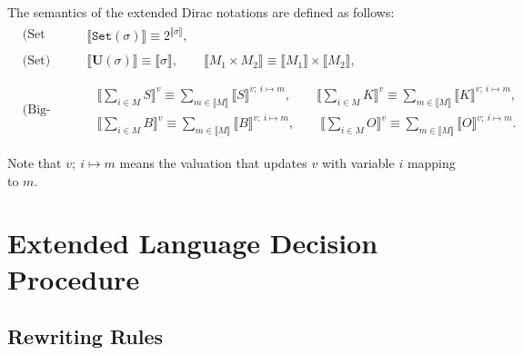 \documentclass[manuscript, review, timestamp]{acmart}
\newcommand*{\reduce}{\ \triangleright\ }
\newcommand*{\sem}[1]{\llbracket #1 \rrbracket}
\begin{document}
\begin{definition}
  The semantics of the extended Dirac notations are defined as follows:
  \begin{align*}
    & \text{(Set Types)} && \begin{aligned}
      \sem{\texttt{Set}(\sigma)} \equiv 2^{\sem{\sigma}},
    \end{aligned} \\
    & \text{(Set)} && \begin{aligned}
      \sem{\mathbf{U}(\sigma)} \equiv \sem{\sigma},
      \qquad
      \sem{M_1 \times M_2} \equiv \sem{M_1} \times \sem{M_2},
    \end{aligned} \\
    \\
    & \text{(Big-op)} && \begin{aligned}
      & \sem{\sum_{i \in M} S}^v \equiv \sum_{m \in \sem{M}} \sem{S}^{v;\ i\mapsto m},
      \qquad
      \sem{\sum_{i \in M} K}^v \equiv \sum_{m \in \sem{M}} \sem{K}^{v;\ i\mapsto m},
      \\
      & \sem{\sum_{i \in M} B}^v \equiv \sum_{m \in \sem{M}} \sem{B}^{v;\ i\mapsto m},
      \qquad
      \sem{\sum_{i \in M} O}^v \equiv \sum_{m \in \sem{M}} \sem{O}^{v;\ i\mapsto m}.
    \end{aligned}
  \end{align*}
\end{definition}

Note that $v;\ i \mapsto m$ means the valuation that updates $v$ with variable $i$ mapping to $m$.

\section{Extended Language Decision Procedure}


\subsection{Rewriting Rules}
\end{document}
